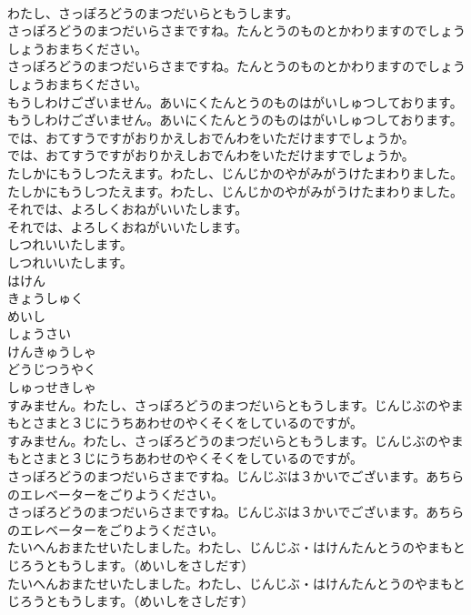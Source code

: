 \documentclass[8pt]{extreport}
\begin{document}
\begin{CJK}{UTF8}{min}
\\	わたし、さっぽろどうのまつだいらともうします。 
\\	さっぽろどうのまつだいらさまですね。たんとうのものとかわりますのでしょうしょうおまちください。	
\\	さっぽろどうのまつだいらさまですね。たんとうのものとかわりますのでしょうしょうおまちください。 
\\	もうしわけございません。あいにくたんとうのものはがいしゅつしております。	
\\	もうしわけございません。あいにくたんとうのものはがいしゅつしております。 
\\	では、おてすうですがおりかえしおでんわをいただけますでしょうか。	
\\	では、おてすうですがおりかえしおでんわをいただけますでしょうか。 
\\	たしかにもうしつたえます。わたし、じんじかのやがみがうけたまわりました。	
\\	たしかにもうしつたえます。わたし、じんじかのやがみがうけたまわりました。 
\\	それでは、よろしくおねがいいたします。	
\\	それでは、よろしくおねがいいたします。 
\\	しつれいいたします。	
\\	しつれいいたします。 
\\	はけん
\\	きょうしゅく
\\	めいし
\\	しょうさい
\\	けんきゅうしゃ
\\	どうじつうやく
\\	しゅっせきしゃ
\\	すみません。わたし、さっぽろどうのまつだいらともうします。じんじぶのやまもとさまと３じにうちあわせのやくそくをしているのですが。	
\\	すみません。わたし、さっぽろどうのまつだいらともうします。じんじぶのやまもとさまと３じにうちあわせのやくそくをしているのですが。 
\\	さっぽろどうのまつだいらさまですね。じんじぶは３かいでございます。あちらのエレベーターをごりようください。	
\\	さっぽろどうのまつだいらさまですね。じんじぶは３かいでございます。あちらのエレベーターをごりようください。 
\\	たいへんおまたせいたしました。わたし、じんじぶ・はけんたんとうのやまもとじろうともうします。（めいしをさしだす）	
\\	たいへんおまたせいたしました。わたし、じんじぶ・はけんたんとうのやまもとじろうともうします。（めいしをさしだす） 

\end{CJK}
\end{document}
